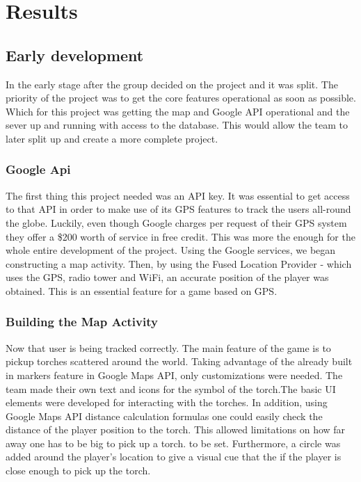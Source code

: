 \documentclass[12pt,a4paper,twoside]{report}
\begin{document}


\section{Results}

\subsection{Early development}

In the early stage after the group decided on the project and it was split. The priority of the project was to get the core features operational as soon as possible. Which for this project was getting the map and Google API operational and the sever up and running with access to the database. This would allow the team to later split up and create a more complete project.

\subsubsection{Google Api}
The first thing this project needed was an API key. It was essential to get access to that API in order to make use of its GPS features to track the users all-round the globe. Luckily, even though Google charges per request of their GPS system they offer a \$200 worth of service in free credit. This was more the enough for the whole entire development of the project. Using the Google services, we began constructing a map activity. Then, by using the Fused Location Provider - which uses the GPS, radio tower and WiFi, an accurate position of the player was obtained. This is an essential feature for a game based on GPS.


\subsubsection{Building the Map Activity}
 
 Now that user is being tracked correctly. The main feature of the game is to pickup torches scattered around the world. Taking advantage of the already built in markers feature in Google Maps API, only customizations were needed. The team made their own text and icons for the symbol of the torch.The basic UI elements were developed for interacting with the torches. In addition, using Google Maps API distance calculation formulas one could easily check the distance of the player position to the torch. This allowed limitations on how far away one has to be big to pick up a torch. to be set. Furthermore, a circle was added around the player's location to give a visual cue that the if the player is close enough to pick up the torch. 
 
\end{document}
